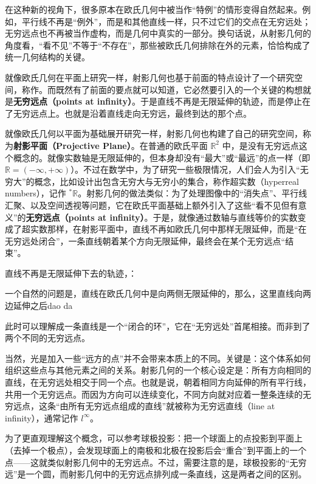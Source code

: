 在这种新的视角下，很多原本在欧氏几何中被当作“特例”的情形变得自然起来。例如，平行线不再是“例外”，而是和其他直线一样，只不过它们的交点在无穷远处；无穷远点也不再被当作虚构，而是几何中真实的一部分。换句话说，从射影几何的角度看，“看不见”不等于“不存在”，那些被欧氏几何排除在外的元素，恰恰构成了统一几何结构的关键。

就像欧氏几何在平面上研究一样，射影几何也基于前面的特点设计了一个研究空间，称作。而既然有了前面的要点就可以知道，它必然要引入的一个关键的构想就是\textbf{无穷远点（points at infinity）}。于是直线不再是无限延伸的轨迹，而是停止在了无穷远点上。也就是沿着直线走向无穷远，最终到达的那个点。

就像欧氏几何以平面为基础展开研究一样，射影几何也构建了自己的研究空间，称为\textbf{射影平面（Projective Plane）}。在普通的欧氏平面 $\mathbb{R}^2$ 中，是没有无穷远点这个概念的。就像实数轴是无限延伸的，但本身却没有“最大”或“最远”的点一样（即 $\mathbb{R} = (-\infty, +\infty)$）。不过在数学中，为了研究一些极限情况，人们会人为引入“无穷大”的概念，比如设计出包含无穷大与无穷小的集合，称作超实数（hyperreal numbers），记作 $^*\mathbb{R}$。射影几何的做法类似：为了处理图像中的“消失点”、平行线汇聚、以及空间透视等问题，它在欧氏平面基础上额外引入了这些“看不见但有意义”的\textbf{无穷远点（points at infinity）}。于是，就像通过数轴与直线等价的实数变成了超实数那样，在射影平面中，直线不再如欧氏几何中那样无限延伸，而是“在无穷远处闭合”，一条直线朝着某个方向无限延伸，最终会在某个无穷远点“结束”。


直线不再是无限延伸下去的轨迹，：

一个自然的问题是，直线在欧氏几何中是向两侧无限延伸的，那么，这里直线向两边延伸之后dao da

此时可以理解成一条直线是一个“闭合的环”，它在“无穷远处”首尾相接。而非到了两个不同的无穷远点。








当然，光是加入一些“远方的点”并不会带来本质上的不同。关键是：这个体系如何组织这些点与其他元素之间的关系。射影几何的一个核心设定是：所有方向相同的直线，在无穷远处相交于同一个点。也就是说，朝着相同方向延伸的所有平行线，共用一个无穷远点。而因为方向可以连续变化，不同方向就对应着一整条连续的无穷远点，这条“由所有无穷远点组成的直线”就被称为无穷远直线（line at infinity），通常记作 $l^\infty$。

为了更直观理解这个概念，可以参考球极投影：把一个球面上的点投影到平面上（去掉一个极点），会发现球面上的南极和北极在投影后会“重合”到平面上的一个点——这就类似射影几何中的无穷远点。不过，需要注意的是，球极投影的“无穷远”是一个圆，而射影几何中的无穷远点排列成一条直线，这是两者之间的区别。

